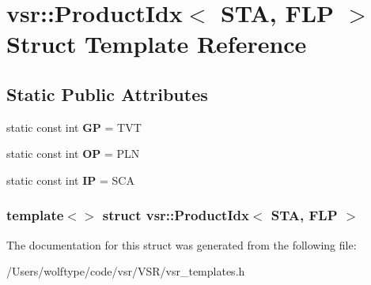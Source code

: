 \hypertarget{structvsr_1_1_product_idx_3_01_s_t_a_00_01_f_l_p_01_4}{\section{vsr\-:\-:Product\-Idx$<$ S\-T\-A, F\-L\-P $>$ Struct Template Reference}
\label{structvsr_1_1_product_idx_3_01_s_t_a_00_01_f_l_p_01_4}
}
\subsection*{Static Public Attributes}
\begin{DoxyCompactItemize}
\item 
\hypertarget{structvsr_1_1_product_idx_3_01_s_t_a_00_01_f_l_p_01_4_a4de9429cd70b43136a31999fb2ad5261}{static const int {\bfseries G\-P} = T\-V\-T}\label{structvsr_1_1_product_idx_3_01_s_t_a_00_01_f_l_p_01_4_a4de9429cd70b43136a31999fb2ad5261}

\item 
\hypertarget{structvsr_1_1_product_idx_3_01_s_t_a_00_01_f_l_p_01_4_a1e0197dca7648c63764fb41e6cf0c610}{static const int {\bfseries O\-P} = P\-L\-N}\label{structvsr_1_1_product_idx_3_01_s_t_a_00_01_f_l_p_01_4_a1e0197dca7648c63764fb41e6cf0c610}

\item 
\hypertarget{structvsr_1_1_product_idx_3_01_s_t_a_00_01_f_l_p_01_4_ad88360a5643149831e58b3c6f23793d1}{static const int {\bfseries I\-P} = S\-C\-A}\label{structvsr_1_1_product_idx_3_01_s_t_a_00_01_f_l_p_01_4_ad88360a5643149831e58b3c6f23793d1}

\end{DoxyCompactItemize}
\subsubsection*{template$<$$>$ struct vsr\-::\-Product\-Idx$<$ S\-T\-A, F\-L\-P $>$}



The documentation for this struct was generated from the following file\-:\begin{DoxyCompactItemize}
\item 
/\-Users/wolftype/code/vsr/\-V\-S\-R/vsr\-\_\-templates.\-h\end{DoxyCompactItemize}
